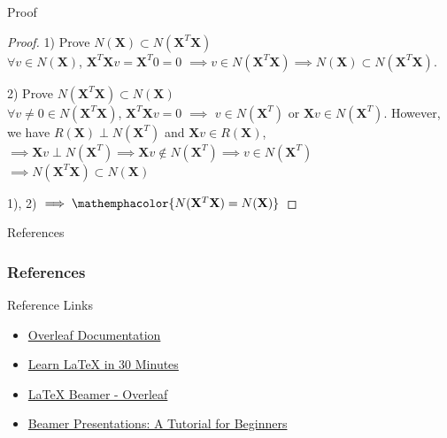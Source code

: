 \documentclass{beamer}
\begin{document}
\begin{frame}{Proof}
    \begin{proof}
        1) Prove $N(\mathbf{X}) \subset N(\mathbf{X}^T\mathbf{X})$ \\
        $\forall v \in N(\mathbf{X})$, $\mathbf{X}^T\mathbf{X}v = \mathbf{X}^T0 = 0$ $\implies v \in N(\mathbf{X}^T\mathbf{X}) \implies N(\mathbf{X}) \subset N(\mathbf{X}^T\mathbf{X})$. \\ \pause
        
        \vspace{0.2in}
        2) Prove $N(\mathbf{X}^T\mathbf{X}) \subset N(\mathbf{X})$ \\
        $\forall v\neq 0 \in N(\mathbf{X}^T\mathbf{X})$, $\mathbf{X}^T\mathbf{X}v = 0$ $\implies$ $v \in N(\mathbf{X}^T)$ or $\mathbf{X}v \in N(\mathbf{X}^T)$. However, we have $R(\mathbf{X}) \perp N(\mathbf{X}^T)$ and $\mathbf{X}v \in R(\mathbf{X})$, $\implies \mathbf{X}v \perp N(\mathbf{X}^T) \implies \mathbf{X}v \notin N(\mathbf{X}^T) \implies v \in N(\mathbf{X}^T)$
        $\implies N(\mathbf{X}^T\mathbf{X}) \subset N(\mathbf{X})$ \\ \pause
        
        \vspace{0.2in}
        1), 2) $\implies \mathemphacolor{N(\mathbf{X}^T\mathbf{X}) = N(\mathbf{X})}$
    \end{proof}
\end{frame}

\begin{frame}[allowframebreaks]{References}
\frametitle{References}
\printbibliography
\end{frame}

\begin{frame}{Reference Links}
    \begin{itemize}
        \item \href{https://www.overleaf.com/learn}{Overleaf Documentation}
        \item \href{https://www.overleaf.com/learn/latex/Learn_LaTeX_in_30_minutes}{Learn LaTeX in 30 Minutes}
        \item \href{https://www.overleaf.com/learn/latex/Beamer}{LaTeX Beamer - Overleaf}
        \item \href{https://www.overleaf.com/learn/latex/Beamer_Presentations:_A_Tutorial_for_Beginners_(Part_1)\%E2\%80\%94Getting_Started}{Beamer Presentations: A Tutorial for Beginners}
    \end{itemize}
\end{frame}
\end{document}
